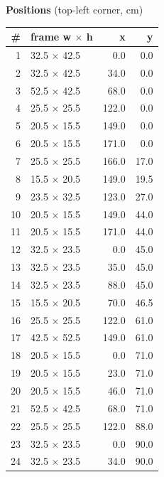 \documentclass[a4paper,landscape,10pt]{article}
\begin{document}
\begin{minipage}[t]{0.25\textwidth}
\vspace{8pt}
{\bfseries Positions} (top-left corner, cm)\\[2pt]
\tiny
\begin{tabular}{@{}r l r r@{}}
\toprule
\# & frame w $\times$ h & x & y \\
\midrule
1 & 32.5 $\times$ 42.5 & 0.0 & 0.0 \\
2 & 32.5 $\times$ 42.5 & 34.0 & 0.0 \\
3 & 52.5 $\times$ 42.5 & 68.0 & 0.0 \\
4 & 25.5 $\times$ 25.5 & 122.0 & 0.0 \\
5 & 20.5 $\times$ 15.5 & 149.0 & 0.0 \\
6 & 20.5 $\times$ 15.5 & 171.0 & 0.0 \\
7 & 25.5 $\times$ 25.5 & 166.0 & 17.0 \\
8 & 15.5 $\times$ 20.5 & 149.0 & 19.5 \\
9 & 23.5 $\times$ 32.5 & 123.0 & 27.0 \\
10 & 20.5 $\times$ 15.5 & 149.0 & 44.0 \\
11 & 20.5 $\times$ 15.5 & 171.0 & 44.0 \\
12 & 32.5 $\times$ 23.5 & 0.0 & 45.0 \\
13 & 32.5 $\times$ 23.5 & 35.0 & 45.0 \\
14 & 32.5 $\times$ 23.5 & 88.0 & 45.0 \\
15 & 15.5 $\times$ 20.5 & 70.0 & 46.5 \\
16 & 25.5 $\times$ 25.5 & 122.0 & 61.0 \\
17 & 42.5 $\times$ 52.5 & 149.0 & 61.0 \\
18 & 20.5 $\times$ 15.5 & 0.0 & 71.0 \\
19 & 20.5 $\times$ 15.5 & 23.0 & 71.0 \\
20 & 20.5 $\times$ 15.5 & 46.0 & 71.0 \\
21 & 52.5 $\times$ 42.5 & 68.0 & 71.0 \\
22 & 25.5 $\times$ 25.5 & 122.0 & 88.0 \\
23 & 32.5 $\times$ 23.5 & 0.0 & 90.0 \\
24 & 32.5 $\times$ 23.5 & 34.0 & 90.0 \\
\bottomrule
\end{tabular}
\end{minipage}
\clearpage
\end{document}

